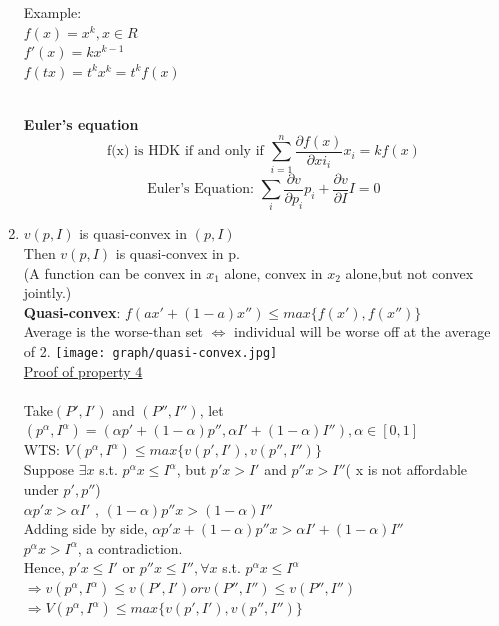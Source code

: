 \documentclass[letterpaper,13pt,single,pdftex]{scrartcl}
\begin{document}
\begin{enumerate}
{\begin{minipage}{6 in}
 Example:\\
 $f(x) = x^k, x \in R$\\
 $f'(x) = kx^{k-1}$\\
 $f(tx) = t^kx^k = t^kf(x)$
 \end{minipage}}\\
 
 \textbf{Euler's equation}
 \[\text{f(x) is HDK if and only if } \sum\limits_{i=1}^{n}\frac{\partial f(x)}{\partial xi_i} x_i = kf(x) \]
 \[\text{Euler's Equation: } \sum\limits_{i}\frac{\partial v}{\partial p_i}p_i +\frac{\partial v}{\partial I}I = 0\]
    \item
    $v(p,I)$ is quasi-convex in $(p,I)$ \\
    Then $v(p,I)$ is quasi-convex in p.\\
    (A function can be convex in $x_1$ alone, convex in $x_2$ alone,but not convex jointly.)\\
    \textbf{Quasi-convex}: $f(ax' +(1-a)x'')\le max\{f(x'),f(x'')\}$\\
    Average is the worse-than set $\Leftrightarrow$ individual will be worse off at the average of 2. 
    \texttt{[image: graph/quasi-convex.jpg]}\\
    \underline{Proof of property 4}\\
    \\
    Take$ (P',I')$ and $(P'',I'')$, let $(p^{\alpha}, I^{\alpha})=(\alpha p' +(1-\alpha)p'',\alpha I'+(1-\alpha)I''), \alpha \in [0,1]$\\
    WTS: $V(p^{\alpha}, I^{\alpha}) \le max \{v(p',I'),v(p'',I'')\}$\\
    Suppose $\exists x$ s.t. $p^{\alpha}x \le I^{\alpha}$, but $p'x> I'$ and $p''x>I''$( x is not affordable under $p',p''$)\\
    $\alpha p'x> \alpha I'$ , $(1-\alpha)p''x>(1-\alpha)I''$\\
    Adding side by side, $\alpha p'x +(1-\alpha)p''x> \alpha I'+ (1-\alpha)I''$\\
    $p^{\alpha}x> I^{\alpha}$, a contradiction.\\
    Hence, $p'x \le I'$ or $p''x\le I'', \forall x$ s.t. $p^{\alpha}x \le I^{\alpha}$\\
    $\Rightarrow v(p^{\alpha}, I^{\alpha}) \le v(P',I') or v(P'',I'') \le v(P'',I'')$\\
    $\Rightarrow V(p^{\alpha}, I^{\alpha}) \le max \{v(p',I'),v(p'',I'')\}$
\end{enumerate}
\end{document}
